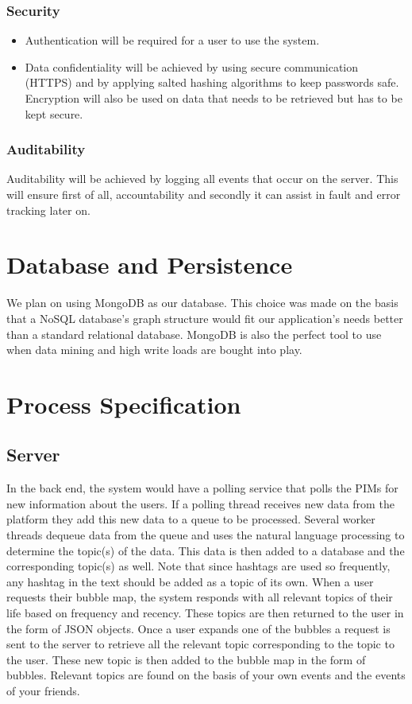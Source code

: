 \documentclass[hidelinks,english]{article}
\begin{document}
			\subsubsection{Security}
				\begin{itemize}
					\item Authentication will be required for a user to use the system.
					\item Data confidentiality will be achieved by using secure communication (HTTPS) and by applying salted hashing algorithms to keep passwords safe. Encryption will also be used on data that needs to be retrieved but has to be kept secure.
				\end{itemize}
											
			\subsubsection{Auditability}
				Auditability will be achieved by logging all events that occur on the server. This will ensure first of all, accountability and secondly it can assist in fault and error tracking later on.
		
	\section{Database and Persistence}
		We plan on using MongoDB as our database. This choice was made on the basis that a NoSQL database's graph structure would fit our application's needs better than a standard relational database. MongoDB is also the perfect tool to use when data mining and high write loads are bought into play.
	
	\section{Process Specification}
		\subsection{Server}
		In the back end, the system would have a polling service that polls the PIMs for new information about the users. If a polling thread receives new data from the platform they add this new data to a queue to be processed. Several worker threads dequeue data from the queue and uses the natural language processing to determine the topic(s) of the data. This data is then added to a database and the corresponding topic(s) as well. Note that since hashtags are used so frequently, any hashtag in the text should be added as a topic of its own. When a user requests their bubble map, the system responds with all relevant topics of their life based on frequency and recency. These topics are then returned to the user in the form of JSON objects. Once a user expands one of the bubbles a request is sent to the server to retrieve all the relevant topic corresponding to the topic to the user. These new topic is then added to the bubble map in the form of bubbles. Relevant topics are found on the basis of your own events and the events of your friends.
		
\end{document}
